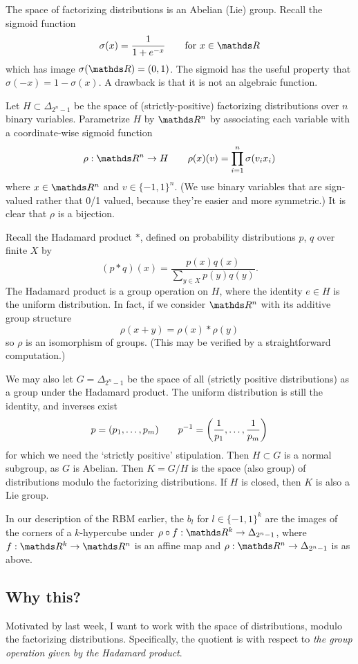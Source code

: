 \documentclass[11pt]{article}
\begin{document}
The space of factorizing distributions is an Abelian (Lie) group.  Recall the
sigmoid function
\[
    \sigma(x) = \frac{1}{1 + e^{-x}}
    \qquad\text{for $x \in \R$}
\]
which has image $\sigma(\R) = (0,1)$.  The sigmoid has the useful property that
$\sigma(-x) = 1 - \sigma(x)$.  A drawback is that it is not an algebraic
function.

Let $H \subset \Delta_{2^n-1}$ be the space of (strictly-positive) factorizing
distributions over $n$ binary variables.  Parametrize $H$ by $\R^n$ by
associating each variable with a coordinate-wise sigmoid function
\[
    \rho : \R^n \to H
    \qquad
    \rho(x)(v) = \prod_{i=1}^n \sigma(v_i x_i)
\]
where $x \in \R^n$ and $v \in \{-1,1\}^n$.  (We use binary variables that are
sign-valued rather that 0/1 valued, because they're easier and more symmetric.)
It is clear that $\rho$ is a bijection.

Recall the Hadamard product $*$, defined on probability distributions $p$, $q$
over finite $X$ by 
\[
    (p * q)(x) = \frac{p(x)q(x)}{\sum_{y \in X} p(y)q(y)}.
\]
The Hadamard product is a group operation on $H$, where the identity $e \in H$
is the uniform distribution.  In fact, if we consider $\R^n$ with its additive
group structure
\[
    \rho(x + y) = \rho(x) * \rho(y)
\]
so $\rho$ is an isomorphism of groups.  (This may be verified by a
straightforward computation.)

We may also let $G = \Delta_{2^n-1}$ be the space of all (strictly positive
distributions) as a group under the Hadamard product.  The uniform distribution
is still the identity, and inverses exist 
\[
    p = (p_1, \ldots, p_m)
    \qquad
    \inv p = \pdil*{\frac 1 {p_1}, \ldots, \frac 1 {p_m}}
\]
for which we need the `strictly positive' stipulation.  Then $H \subset G$ is a
normal subgroup, as $G$ is Abelian.  Then $K = G/H$ is the space (also group) of
distributions modulo the factorizing distributions.  If $H$ is closed, then $K$
is also a Lie group.

In our description of the RBM earlier, the $b_l$ for $l \in \{-1,1\}^k$ are the
images of the corners of a $k$-hypercube under $\rho \circ f: \R^k \to
\Delta_{2^n - 1}$, where $f: \R^k \to \R^n$ is an affine map and $\rho: \R^n \to
\Delta_{2^n - 1}$ is as above.

\subsection{Why this?}

Motivated by last week, I want to work with the space of distributions, modulo
the factorizing distributions.  Specifically, the quotient is with respect to
\textit{the group operation given by the Hadamard product}.
\end{document}
